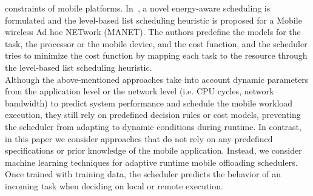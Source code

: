 \documentclass[10pt, conference, compsocconf]{IEEEtran}
\begin{document}
constraints of mobile platforms.
%
In~\cite{waleed}, a novel energy-aware scheduling is
formulated and the level-based list scheduling heuristic is proposed for
a Mobile wireless Ad hoc NETwork (MANET).
%
The authors predefine the models for the task, the processor or the
mobile device, and the cost function, and the scheduler tries to
minimize the cost function by mapping each task to the resource through
the level-based list scheduling heuristic.\\
%
%
%
%
%
%
\indent Although the above-mentioned approaches take into account dynamic parameters
from the application level or the network level (i.e. CPU cycles,
network bandwidth) to predict system performance and schedule the mobile
workload execution, they still rely on predefined decision rules or cost
models, preventing the scheduler from adapting to dynamic conditions
during runtime.
%
In contrast, in this paper we consider approaches that do not rely on
any predefined specifications or prior knowledge of the mobile
application.
%
Instead, we consider machine learning techniques for adaptive runtime mobile
offloading schedulers.
%
Once trained with training data, the scheduler 
predicts the behavior of an incoming task when deciding on local or
remote execution.
% 
\end{document}

